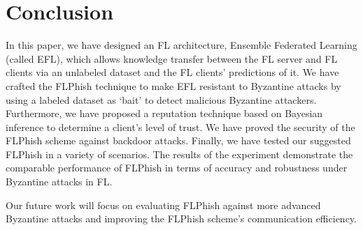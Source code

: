 \documentclass[journal]{IEEEtran}
\begin{document}
\section{Conclusion}
In this paper, we have designed an FL architecture, Ensemble Federated Learning (called EFL), which allows knowledge transfer between the FL server and FL clients via an unlabeled dataset and the FL clients' predictions of it. We have crafted the FLPhish technique to make EFL resistant to Byzantine attacks by using a labeled dataset as `bait' to detect malicious Byzantine attackers. Furthermore, we have proposed a reputation technique based on Bayesian inference to determine a client's level of trust. We have proved the security of the FLPhish scheme against backdoor attacks. Finally, we have tested our suggested FLPhish in a variety of scenarios. The results of the experiment demonstrate the comparable performance of FLPhish in terms of accuracy and robustness under Byzantine attacks in FL. 
\par Our future work will focus on evaluating FLPhish against more advanced Byzantine attacks and improving the FLPhish scheme's communication efficiency.






\end{document}
